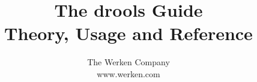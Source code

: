 \documentclass[10pt,letterpaper,colorhighlight]{book}
\begin{document}
\let\footnoterule\hrule

\makeatletter
\renewcommand{\@makefntext}[1]%
	{\noindent\makebox[1.8em][r]{\@makefnmark}#1}
\makeatother

\title{
	The \textsf{drools} Guide\\
	\bigskip
	\textsf{\normalsize{}Theory, Usage and Reference}
}

\author{
	\textsf{The Werken Company}\\
	\textsf{www.werken.com}
}


\frontmatter

\maketitle

\tableofcontents
\listoffigures

\mainmatter









\appendix






\end{document}
